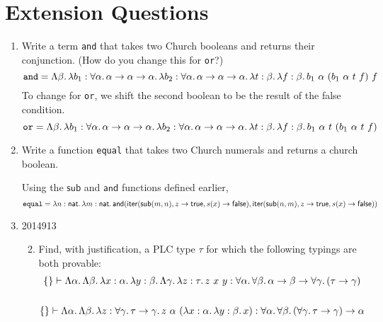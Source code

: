 \documentclass[10pt,\jkfside,a4paper]{article}
\begin{document}
\section{Extension Questions}

\begin{enumerate}

    \item Write a term \texttt{and} that takes two Church booleans and returns their conjunction. (How do you change this for \texttt{or}?)
    \[
        \texttt{and} =
        \Lambda \beta\ldotp
        \lambda b_1: \forall \alpha\ldotp \alpha \to \alpha \to \alpha\ldotp
        \lambda b_2: \forall \alpha\ldotp \alpha \to \alpha \to \alpha\ldotp
        \lambda t: \beta\ldotp
        \lambda f: \beta\ldotp
        b_1\ \alpha\ (b_1\ \alpha\ t\ f)\ f
    \]
    To change for \texttt{or}, we shift the second boolean to be the result of the false condition.
    \[
        \texttt{or} =
        \Lambda \beta\ldotp
        \lambda b_1: \forall \alpha\ldotp \alpha \to \alpha \to \alpha\ldotp
        \lambda b_2: \forall \alpha\ldotp \alpha \to \alpha \to \alpha\ldotp
        \lambda t: \beta\ldotp
        \lambda f: \beta\ldotp
        b_1\ \alpha\ t\ (b_1\ \alpha\ t\ f)
    \]

    \item Write a function \texttt{equal} that takes two Church numerals and returns a church boolean.

    Using the $\mathsf{sub}$ and $\mathsf{and}$ functions defined earlier,
    \[
        \texttt{equal} = \lambda n: \mathsf{nat}\ldotp \lambda m: \mathsf{nat}\ldotp \mathsf{and}(\mathsf{iter}(\mathsf{sub}(m, n), z \to \mathsf{true}, s(x) \to \mathsf{false}),
        \mathsf{iter}(\mathsf{sub}(n, m), z \to \mathsf{true}, s(x) \to \mathsf{false}))
    \]

    \item
    \begin{examquestion}{2014}{9}{13}

        \begin{enumerate}[label=(\alph*)]

            \setcounter{enumii}{1}

            \item Find, with justification, a PLC type $\tau$ for which the following typings are both provable:
            \begin{gather*}
                \{\} \vdash
                \Lambda \alpha\ldotp \Lambda \beta\ldotp \lambda x: \alpha\ldotp \lambda y: \beta\ldotp \Lambda \gamma\ldotp \lambda z: \tau\ldotp z\ x\ y
                : \forall \alpha\ldotp \forall \beta\ldotp \alpha \to \beta \to \forall \gamma\ldotp (\tau \to \gamma)
                \\\\
                \{\} \vdash
                \Lambda \alpha\ldotp \Lambda \beta \ldotp \lambda z: \forall \gamma\ldotp \tau \to \gamma\ldotp z\ \alpha\ (\lambda x: \alpha\ldotp \lambda y: \beta\ldotp x)
                : \forall \alpha\ldotp \forall \beta \ldotp (\forall \gamma\ldotp \tau \to \gamma) \to \alpha
            \end{gather*}


\end{enumerate}
\end{examquestion}
\end{enumerate}
\end{document}
